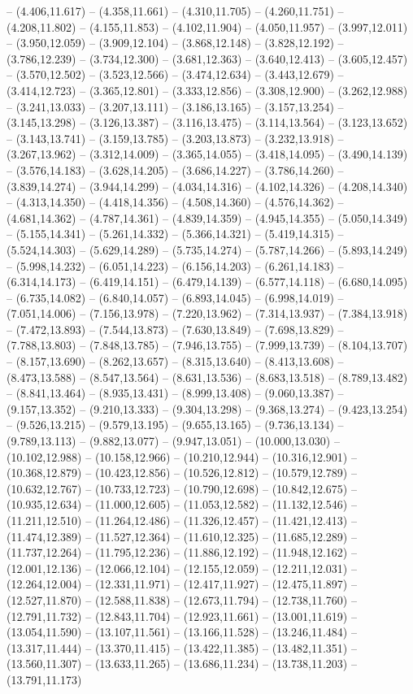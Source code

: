 -- (4.406,11.617) -- (4.358,11.661) -- (4.310,11.705) -- (4.260,11.751) -- (4.208,11.802) -- (4.155,11.853) -- (4.102,11.904) -- (4.050,11.957) -- (3.997,12.011) -- (3.950,12.059) -- (3.909,12.104) -- (3.868,12.148) -- (3.828,12.192) -- (3.786,12.239) -- (3.734,12.300) -- (3.681,12.363) -- (3.640,12.413) -- (3.605,12.457) -- (3.570,12.502) -- (3.523,12.566) -- (3.474,12.634) -- (3.443,12.679) -- (3.414,12.723) -- (3.365,12.801) -- (3.333,12.856) -- (3.308,12.900) -- (3.262,12.988) -- (3.241,13.033) -- (3.207,13.111) -- (3.186,13.165) -- (3.157,13.254) -- (3.145,13.298) -- (3.126,13.387) -- (3.116,13.475) -- (3.114,13.564) -- (3.123,13.652) -- (3.143,13.741) -- (3.159,13.785) -- (3.203,13.873) -- (3.232,13.918) -- (3.267,13.962) -- (3.312,14.009) -- (3.365,14.055) -- (3.418,14.095) -- (3.490,14.139) -- (3.576,14.183) -- (3.628,14.205) -- (3.686,14.227) -- (3.786,14.260) -- (3.839,14.274) -- (3.944,14.299) -- (4.034,14.316) -- (4.102,14.326) -- (4.208,14.340) -- (4.313,14.350) -- (4.418,14.356) -- (4.508,14.360) -- (4.576,14.362) -- (4.681,14.362) -- (4.787,14.361) -- (4.839,14.359) -- (4.945,14.355) -- (5.050,14.349) -- (5.155,14.341) -- (5.261,14.332) -- (5.366,14.321) -- (5.419,14.315) -- (5.524,14.303) -- (5.629,14.289) -- (5.735,14.274) -- (5.787,14.266) -- (5.893,14.249) -- (5.998,14.232) -- (6.051,14.223) -- (6.156,14.203) -- (6.261,14.183) -- (6.314,14.173) -- (6.419,14.151) -- (6.479,14.139) -- (6.577,14.118) -- (6.680,14.095) -- (6.735,14.082) -- (6.840,14.057) -- (6.893,14.045) -- (6.998,14.019) -- (7.051,14.006) -- (7.156,13.978) -- (7.220,13.962) -- (7.314,13.937) -- (7.384,13.918) -- (7.472,13.893) -- (7.544,13.873) -- (7.630,13.849) -- (7.698,13.829) -- (7.788,13.803) -- (7.848,13.785) -- (7.946,13.755) -- (7.999,13.739) -- (8.104,13.707) -- (8.157,13.690) -- (8.262,13.657) -- (8.315,13.640) -- (8.413,13.608) -- (8.473,13.588) -- (8.547,13.564) -- (8.631,13.536) -- (8.683,13.518) -- (8.789,13.482) -- (8.841,13.464) -- (8.935,13.431) -- (8.999,13.408) -- (9.060,13.387) -- (9.157,13.352) -- (9.210,13.333) -- (9.304,13.298) -- (9.368,13.274) -- (9.423,13.254) -- (9.526,13.215) -- (9.579,13.195) -- (9.655,13.165) -- (9.736,13.134) -- (9.789,13.113) -- (9.882,13.077) -- (9.947,13.051) -- (10.000,13.030) -- (10.102,12.988) -- (10.158,12.966) -- (10.210,12.944) -- (10.316,12.901) -- (10.368,12.879) -- (10.423,12.856) -- (10.526,12.812) -- (10.579,12.789) -- (10.632,12.767) -- (10.733,12.723) -- (10.790,12.698) -- (10.842,12.675) -- (10.935,12.634) -- (11.000,12.605) -- (11.053,12.582) -- (11.132,12.546) -- (11.211,12.510) -- (11.264,12.486) -- (11.326,12.457) -- (11.421,12.413) -- (11.474,12.389) -- (11.527,12.364) -- (11.610,12.325) -- (11.685,12.289) -- (11.737,12.264) -- (11.795,12.236) -- (11.886,12.192) -- (11.948,12.162) -- (12.001,12.136) -- (12.066,12.104) -- (12.155,12.059) -- (12.211,12.031) -- (12.264,12.004) -- (12.331,11.971) -- (12.417,11.927) -- (12.475,11.897) -- (12.527,11.870) -- (12.588,11.838) -- (12.673,11.794) -- (12.738,11.760) -- (12.791,11.732) -- (12.843,11.704) -- (12.923,11.661) -- (13.001,11.619) -- (13.054,11.590) -- (13.107,11.561) -- (13.166,11.528) -- (13.246,11.484) -- (13.317,11.444) -- (13.370,11.415) -- (13.422,11.385) -- (13.482,11.351) -- (13.560,11.307) -- (13.633,11.265) -- (13.686,11.234) -- (13.738,11.203) -- (13.791,11.173) 